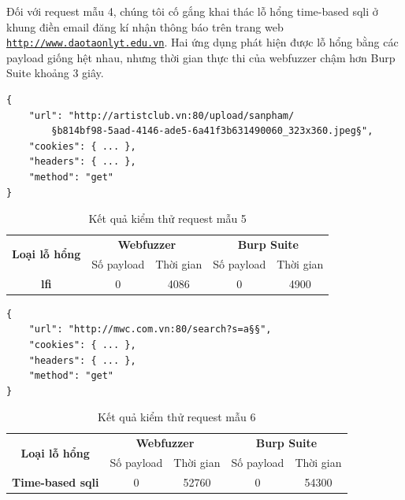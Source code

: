 \FloatBarrier
Đối với request mẫu 4, chúng tôi cố gắng khai thác lỗ hổng time-based \acrshort{sqli} ở khung điền email đăng kí nhận thông báo trên trang web \href{http://www.daotaonlyt.edu.vn}{\texttt{http://www.daotaonlyt.edu.vn}}. Hai ứng dụng phát hiện được lỗ hổng bằng các payload giống hệt nhau, nhưng thời gian thực thi của webfuzzer chậm hơn Burp Suite khoảng 3 giây.
\begin{lstlisting}[style=ES6, label={lst:base-request-5}, caption={Request mẫu 5}]
{
    "url": "http://artistclub.vn:80/upload/sanpham/
        §b814bf98-5aad-4146-ade5-6a41f3b631490060_323x360.jpeg§",
    "cookies": { ... },
    "headers": { ... },
    "method": "get"
}
\end{lstlisting}
\FloatBarrier
\begin{table}[ht]
    \centering
    \caption{Kết quả kiểm thử request mẫu 5}
    \label{tab:testing-result-5}
    \begin{tabular}[ht]{ccccc}
        \toprule[1pt]\midrule[0.3pt]
            \multirow{2}{*}{\textbf{Loại lỗ hổng}}&\multicolumn{2}{c}{\textbf{Webfuzzer}}&\multicolumn{2}{c}{\textbf{Burp Suite}}\\
            \cmidrule(lr){2-3}\cmidrule(lr){4-5}{}&Số payload&Thời gian&Số payload&Thời gian\\
        \midrule[0.3pt]
            \textbf{\acrshort{lfi}}&0&4086&0&4900\\
        \midrule[0.3pt]\bottomrule[1pt]
    \end{tabular}
\end{table}
\FloatBarrier
\begin{lstlisting}[style=ES6, label={lst:base-request-6}, caption={Request mẫu 6}]
{
    "url": "http://mwc.com.vn:80/search?s=a§§",
    "cookies": { ... },
    "headers": { ... },
    "method": "get"
}
\end{lstlisting}
\FloatBarrier
\begin{table}[ht]
    \centering
    \caption{Kết quả kiểm thử request mẫu 6}
    \label{tab:testing-result-6}
    \begin{tabular}[ht]{ccccc}
        \toprule[1pt]\midrule[0.3pt]
            \multirow{2}{*}{\textbf{Loại lỗ hổng}}&\multicolumn{2}{c}{\textbf{Webfuzzer}}&\multicolumn{2}{c}{\textbf{Burp Suite}}\\
            \cmidrule(lr){2-3}\cmidrule(lr){4-5}{}&Số payload&Thời gian&Số payload&Thời gian\\
        \midrule[0.3pt]
            \textbf{Time-based \acrshort{sqli}}&0&52760&0&54300\\
        \midrule[0.3pt]\bottomrule[1pt]
    \end{tabular}
\end{table}
